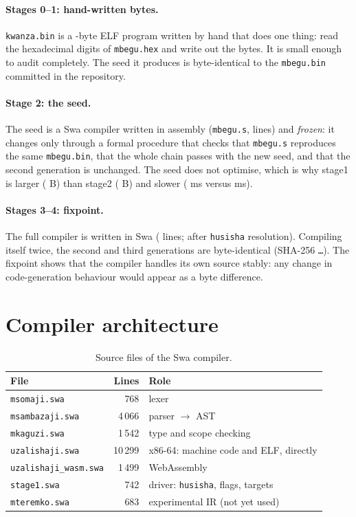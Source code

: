 \documentclass[11pt,a4paper]{article}
\begin{document}
\paragraph{Stages 0--1: hand-written bytes.} \texttt{kwanza.bin} is a \KwanzaBaiti-byte ELF program written by hand that does one thing: read the hexadecimal digits of \texttt{mbegu.hex} and write out the bytes. It is small enough to audit completely. The seed it produces is byte-identical to the \texttt{mbegu.bin} committed in the repository.

\paragraph{Stage 2: the seed.} The seed is a Swa compiler written in assembly (\texttt{mbegu.s}, \MbeguMistari{} lines) and \emph{frozen}: it changes only through a formal procedure that checks that \texttt{mbegu.s} reproduces the same \texttt{mbegu.bin}, that the whole chain passes with the new seed, and that the second generation is unchanged. The seed does not optimise, which is why stage1 is larger (\StageMojaBaiti{} B) than stage2 (\StageMbiliBaiti{} B) and slower (\MudaStageMoja{} ms versus \MudaStageMbili{} ms).

\paragraph{Stages 3--4: fixpoint.} The full compiler is written in Swa (\MkusanyajiMistari{} lines; \ZimaMistari{} after \texttt{husisha} resolution). Compiling itself twice, the second and third generations are byte-identical (SHA-256 \texttt{\ShaFixpoint\ldots}). The fixpoint shows that the compiler handles its own source stably: any change in code-generation behaviour would appear as a byte difference.

\section{Compiler architecture}\label{sec:usanifu}

\begin{table}[h]
\centering
\begin{tabular}{@{}lrl@{}}
\toprule
File & Lines & Role \\
\midrule
\texttt{msomaji.swa} & 768 & lexer \\
\texttt{msambazaji.swa} & 4\,066 & parser $\to$ AST \\
\texttt{mkaguzi.swa} & 1\,542 & type and scope checking \\
\texttt{uzalishaji.swa} & 10\,299 & x86-64: machine code and ELF, directly \\
\texttt{uzalishaji\_wasm.swa} & 1\,499 & WebAssembly \\
\texttt{stage1.swa} & 742 & driver: \texttt{husisha}, flags, targets \\
\texttt{mteremko.swa} & 683 & experimental IR (not yet used) \\
\bottomrule
\end{tabular}
\caption{Source files of the Swa \Toleo{} compiler.}
\end{table}
\end{document}
